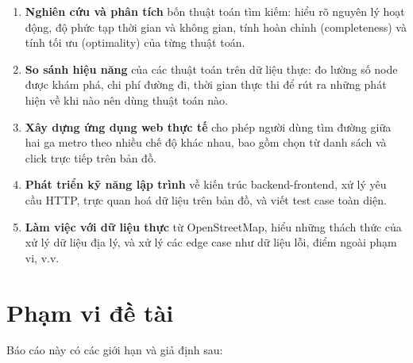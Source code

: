 \begin{enumerate}
  \item \textbf{Nghiên cứu và phân tích} bốn thuật toán tìm kiếm: hiểu rõ nguyên lý hoạt động, độ phức tạp thời gian và không gian, tính hoàn chỉnh (completeness) và tính tối ưu (optimality) của từng thuật toán.

  \item \textbf{So sánh hiệu năng} của các thuật toán trên dữ liệu thực: đo lường số node được khám phá, chi phí đường đi, thời gian thực thi để rút ra những phát hiện về khi nào nên dùng thuật toán nào.

  \item \textbf{Xây dựng ứng dụng web thực tế} cho phép người dùng tìm đường giữa hai ga metro theo nhiều chế độ khác nhau, bao gồm chọn từ danh sách và click trực tiếp trên bản đồ.

  \item \textbf{Phát triển kỹ năng lập trình} về kiến trúc backend-frontend, xử lý yêu cầu HTTP, trực quan hoá dữ liệu trên bản đồ, và viết test case toàn diện.

  \item \textbf{Làm việc với dữ liệu thực} từ OpenStreetMap, hiểu những thách thức của xử lý dữ liệu địa lý, và xử lý các edge case như dữ liệu lỗi, điểm ngoài phạm vi, v.v.
\end{enumerate}

\section{Phạm vi đề tài}

Báo cáo này có các giới hạn và giả định sau:

